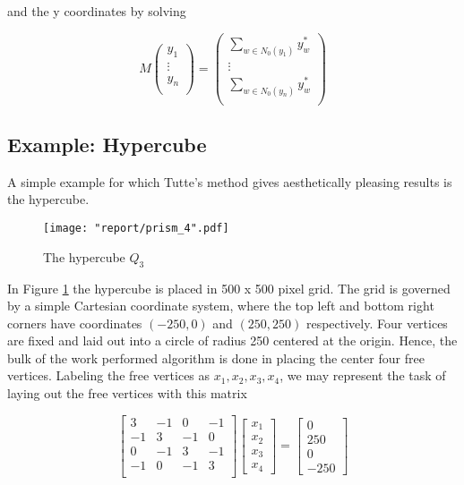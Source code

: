 \documentclass[11pt]{report}
\begin{document}
and the y coordinates by solving

\begin{equation}\label{eqn:barycenter_matrix_y}
    M \begin{pmatrix}
       y_1 \\ \vdots \\ y_n \\
    \end{pmatrix} =
    \begin{pmatrix}
        \sum_{w \in N_0(y_1)} y^*_w \\
        \vdots \\
        \sum_{w \in N_0(y_n)} y^*_w \\
    \end{pmatrix}
\end{equation}

\subsection{Example: Hypercube}
A simple example for which Tutte's method gives aesthetically pleasing results is the hypercube.

\begin{figure}[H]\label{fig:hypercube}
    \centering
    \texttt{[image: "report/prism\_4".pdf]}
    \caption{The hypercube $Q_3$}
\end{figure}

In Figure \ref{fig:hypercube} the hypercube is placed in 500 x 500 pixel grid. The grid is governed by a simple Cartesian coordinate system, where the top left and bottom right corners have coordinates $(-250, 0)$ and $(250, 250)$ respectively. Four vertices are fixed and laid out into a circle of radius 250 centered at the origin. Hence, the bulk of the work performed algorithm is done in placing the center four free vertices. Labeling the free vertices as $x_1, x_2, x_3, x_4$, we may represent the task of laying out the free vertices with this matrix

\[
\begin{bmatrix}
    3 & -1 & 0 & -1 \\
    -1 & 3 & -1 & 0 \\
    0 & -1 & 3 & -1 \\
    -1 & 0 & -1 & 3 \\
\end{bmatrix}
\begin{bmatrix} x_1 \\ x_2 \\ x_3 \\ x_4 \end{bmatrix} =
\begin{bmatrix} 0 \\ 250 \\ 0 \\ -250 \end{bmatrix}
\]
\end{document}
